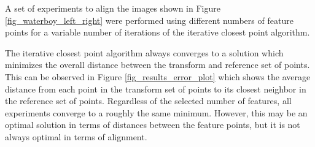 \documentclass{article}
\begin{document}
A set of experiments to align the images shown in Figure \ref{fig_waterboy_left_right} were performed using different numbers of feature points for a variable number of iterations of the iterative closest point algorithm.

The iterative closest point algorithm always converges to a solution which minimizes the overall distance between the transform and reference set of points. This can be observed in Figure \ref{fig_results_error_plot} which shows the average distance from each point in the transform set of points to its closest neighbor in the reference set of points. Regardless of the selected number of features, all experiments converge to a roughly the same minimum. However, this may be an optimal solution in terms of distances between the feature points, but it is not always optimal in terms of alignment. 
\end{document}
